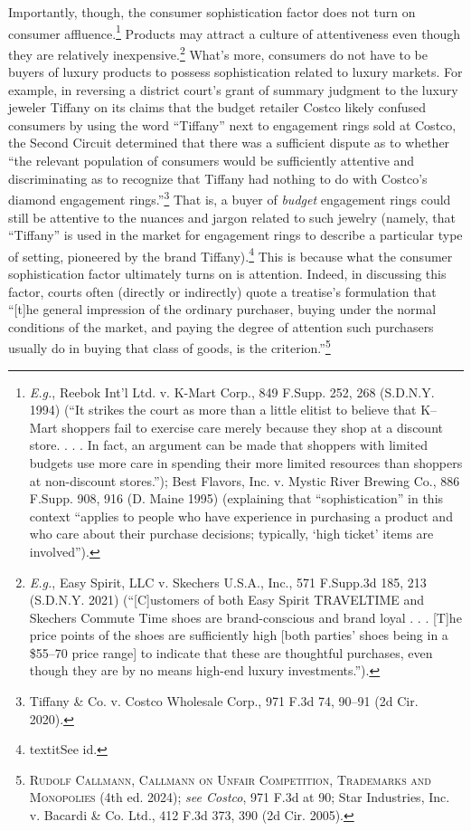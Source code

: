 \documentclass[letterpaper, 11pt, oneside]{article}
\begin{document}
Importantly, though, the consumer sophistication factor does not turn on consumer affluence.\footnote{\textit{E.g.}, Reebok Int'l Ltd. v. K-Mart Corp., 849 F.Supp. 252, 268 (S.D.N.Y. 1994) (``It strikes the court as more than a little elitist to believe that K–Mart shoppers fail to exercise care merely because they shop at a discount store. . . . In fact, an argument can be made that shoppers with limited budgets use more care in spending their more limited resources than shoppers at non-discount stores.''); Best Flavors, Inc. v. Mystic River Brewing Co., 886 F.Supp. 908, 916 (D. Maine 1995) (explaining that ``sophistication'' in this context ``applies to people who have experience in purchasing a product and who care about their purchase decisions; typically, `high ticket' items are involved'').} Products may attract a culture of attentiveness even though they are relatively inexpensive.\footnote{\textit{E.g.}, Easy Spirit, LLC v. Skechers U.S.A., Inc., 571 F.Supp.3d 185, 213 (S.D.N.Y. 2021) (``[C]ustomers of both Easy Spirit TRAVELTIME and Skechers Commute Time shoes are brand-conscious and brand loyal . . . [T]he price points of the shoes are sufficiently high [both parties' shoes being in a \$55–70 price range] to indicate that these are thoughtful purchases, even though they are by no means high-end luxury investments.'').} What's more, consumers do not have to be buyers of luxury products to possess sophistication related to luxury markets. For example, in reversing a district court's grant of summary judgment to the luxury jeweler Tiffany on its claims that the budget retailer Costco likely confused consumers by using the word ``Tiffany'' next to engagement rings sold at Costco, the Second Circuit determined that there was a sufficient dispute as to whether ``the relevant population of consumers would be sufficiently attentive and discriminating as to recognize that Tiffany had nothing to do with Costco’s diamond engagement rings.''\footnote{Tiffany \& Co. v. Costco Wholesale Corp., 971 F.3d 74, 90–91 (2d Cir. 2020).} That is, a buyer of \textit{budget} engagement rings could still be attentive to the nuances and jargon related to such jewelry (namely, that ``Tiffany'' is used in the market for engagement rings to describe a particular type of setting, pioneered by the brand Tiffany).\footnote{textit{See id.}} This is because what the consumer sophistication factor ultimately turns on is attention. Indeed, in discussing this factor, courts often (directly or indirectly) quote a treatise's formulation that ``[t]he general impression of the ordinary purchaser, buying under the normal conditions of the market, and paying the degree of attention such purchasers usually do in buying that class of goods, is the criterion.''\footnote{\textsc{Rudolf Callmann, Callmann on Unfair Competition, Trademarks and Monopolies} (4th ed. 2024); \textit{see Costco}, 971 F.3d at 90; Star Industries, Inc. v. Bacardi \& Co. Ltd., 412 F.3d 373, 390 (2d Cir. 2005).}
\end{document}
